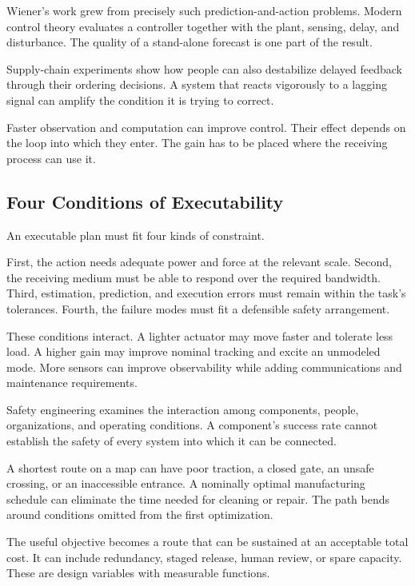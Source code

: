 Wiener's work grew from precisely such prediction-and-action problems.\cite{wiener1948} Modern control theory evaluates a controller together with the plant, sensing, delay, and disturbance.\cite{astrom2008} The quality of a stand-alone forecast is one part of the result.

Supply-chain experiments show how people can also destabilize delayed feedback through their ordering decisions.\cite{sterman1989,lee1997} A system that reacts vigorously to a lagging signal can amplify the condition it is trying to correct.

Faster observation and computation can improve control. Their effect depends on the loop into which they enter. The gain has to be placed where the receiving process can use it.

\subsection{Four Conditions of Executability}


An executable plan must fit four kinds of constraint.

First, the action needs adequate power and force at the relevant scale. Second, the receiving medium must be able to respond over the required bandwidth. Third, estimation, prediction, and execution errors must remain within the task's tolerances. Fourth, the failure modes must fit a defensible safety arrangement.

These conditions interact. A lighter actuator may move faster and tolerate less load. A higher gain may improve nominal tracking and excite an unmodeled mode. More sensors can improve observability while adding communications and maintenance requirements.

Safety engineering examines the interaction among components, people, organizations, and operating conditions.\cite{perrow1984,leveson2011} A component's success rate cannot establish the safety of every system into which it can be connected.


A shortest route on a map can have poor traction, a closed gate, an unsafe crossing, or an inaccessible entrance. A nominally optimal manufacturing schedule can eliminate the time needed for cleaning or repair. The path bends around conditions omitted from the first optimization.

The useful objective becomes a route that can be sustained at an acceptable total cost. It can include redundancy, staged release, human review, or spare capacity. These are design variables with measurable functions.

